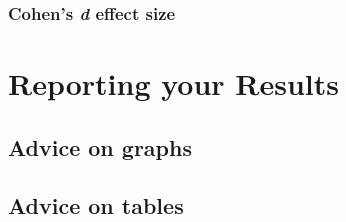 \documentclass[
]{report}
\begin{document}
\hypertarget{cohens-d-effect-size}{%
\subsection{\texorpdfstring{Cohen's \emph{d} effect
size}{Cohen's d effect size}}\label{cohens-d-effect-size}}

\hypertarget{reporting-your-results}{%
\chapter{Reporting your Results}\label{reporting-your-results}}

\hypertarget{advice-on-graphs}{%
\section{Advice on graphs}\label{advice-on-graphs}}

\hypertarget{advice-on-tables}{%
\section{Advice on tables}\label{advice-on-tables}}

  
\end{document}
